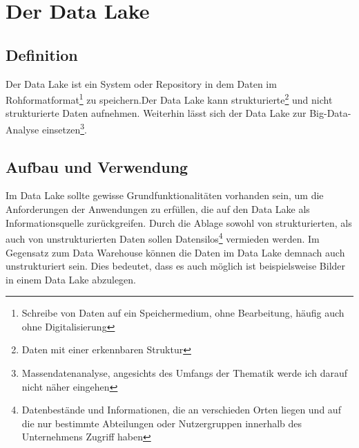 \section{Der Data Lake}
\subsection{Definition}
Der Data Lake ist ein System oder Repository in dem Daten im Rohformatformat\footnote{Schreibe von Daten auf ein Speichermedium, ohne Bearbeitung, häufig auch ohne Digitalisierung} zu speichern.Der Data Lake kann strukturierte\footnote{Daten mit einer erkennbaren Struktur} und nicht strukturierte Daten aufnehmen. Weiterhin lässt sich der Data Lake zur Big-Data-Analyse einsetzen\footnote{Massendatenanalyse, angesichts des Umfangs der Thematik werde ich darauf nicht näher eingehen}.\cite{Wikipedia:Data_Lake} \cite{BigData-Insider:Data_Lake}
\subsection{Aufbau und Verwendung}
Im Data Lake sollte gewisse Grundfunktionalitäten vorhanden sein, um die Anforderungen der Anwendungen zu erfüllen, die auf den Data Lake als Informationsquelle zurückgreifen. Durch die Ablage sowohl von strukturierten, als auch von unstrukturierten Daten sollen Datensilos\footnote{Datenbestände und Informationen, die an verschieden Orten liegen und auf die nur bestimmte Abteilungen oder Nutzergruppen innerhalb des Unternehmens Zugriff haben\cite{DigitalWiki:Datensilo}} vermieden werden. Im Gegensatz zum Data Warehouse können die Daten im Data Lake demnach auch unstrukturiert sein. Dies bedeutet, dass es auch möglich ist beispielsweise Bilder in einem Data Lake abzulegen.  \cite{BigData-Insider:Data_Lake}\cite{AT:Data_Lake}
